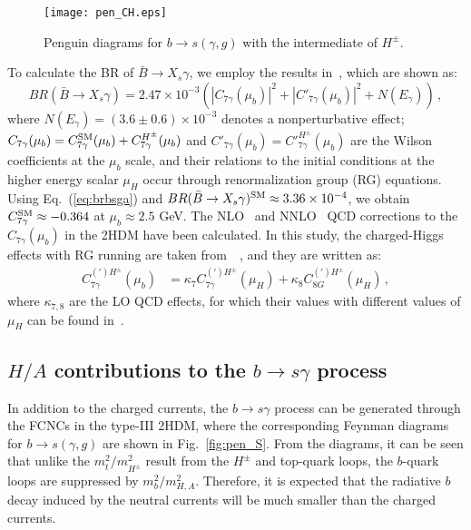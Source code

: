 \documentclass[prd,preprint,superscriptaddress,amsmath,amssymb]{revtex4}
\begin{document}
\begin{figure}[phtb]
\texttt{[image: pen\_CH.eps]}
\caption{ Penguin diagrams for $b\to s (\gamma, g)$ with the intermediate of $H^\pm$.}
\label{fig:pen_CH}
\end{figure} 


 
 To calculate the BR of $\bar B \to X_s \gamma$, we employ the results  in~\cite{Blanke:2011ry,Buras:2011zb}, which are  shown as:
 \begin{equation}
  BR(\bar B \to X_s \gamma)  = 2.47\times 10^{-3} \left( |C_{7\gamma}(\mu_b) |^2 + |C'_{7\gamma}(\mu_b)|^2 + N(E_\gamma) \right)\,, \label{eq:brbsga}
  \end{equation}
where $N(E_\gamma) =(3.6 \pm 0.6)\times 10^{-3}$ denotes a nonperturbative effect;  $C_{7\gamma}(\mu_b) = C^{\rm SM}_{7\gamma}(\mu_b) + C^{H^\pm}_{7\gamma}(\mu_b)$ and $C'_{7\gamma}(\mu_b) = C'^{H^\pm}_{7\gamma}(\mu_b)$ are the Wilson coefficients at  the $\mu_b$ scale, and their relations to the initial conditions at the higher energy scalar $\mu_H$ occur  through renormalization group (RG) equations. Using Eq.~(\ref{eq:brbsga}) and $BR(\bar B\to X_s \gamma)^{\rm SM} \approx 3.36\times 10^{-4}$, we obtain $C^{\rm SM}_{7\gamma}\approx -0.364$ at $\mu_b\approx 2.5$ GeV. The NLO~\cite{Ciuchini:1997xe,Borzumati:1998tg,Borzumati:1998nx} and NNLO~\cite{Hermann:2012fc} QCD corrections to the $C_{7\gamma}(\mu_b)$ in the 2HDM have been calculated. In this study,  the charged-Higgs effects  with RG running are taken from~~\cite{Blanke:2011ry,Buras:2011zb}, and they are written as:
 \begin{align}
 C^{(\prime)H^\pm}_{7\gamma} (\mu_b) & =  \kappa_7 C^{(\prime)H^\pm}_{7\gamma} (\mu_H) + \kappa_8 C^{(\prime)H^\pm}_{8G}(\mu_H)\,, \label{eq:Wsatmub}
 \end{align}
 where $\kappa_{7,8}$ are the LO QCD effects, for which their values with different values of $\mu_H$ can be found in~\cite{Blanke:2011ry,Buras:2011zb}.  


 \subsection{$H/A$ contributions to the $b\to s \gamma$ process}
 
 In addition to the charged currents, the $b\to s \gamma$ process can be generated through the FCNCs in the type-III 2HDM, where the corresponding Feynman diagrams for $b\to s (\gamma, g)$ are shown in Fig.~\ref{fig:pen_S}. From the diagrams, it can be seen that unlike the   $m^2_t/m^2_{H^\pm}$ result from the $H^\pm$  and top-quark loops,  the $b$-quark loops are suppressed by $m^2_b/m^2_{H,A}$.  Therefore, it is expected that the radiative $b$ decay induced by the neutral currents will be much smaller than the charged currents. 
\end{document}
